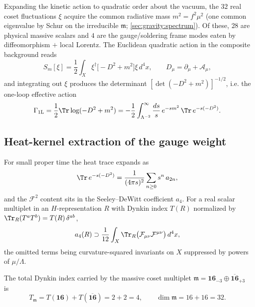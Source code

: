 Expanding the kinetic action to quadratic order about the vacuum, the
$32$ real coset fluctuations $\xi$ acquire the common radiative mass
$m^{2}=f^{2}\mu^{2}$ (one common eigenvalue by Schur on the irreducible
$\mathfrak m$; \autoref{sec:gravity:spectrum}). Of these, $28$ are
physical massive scalars and $4$ are the gauge/soldering frame modes
eaten by diffeomorphism $+$ local Lorentz. The Euclidean quadratic
action in the composite background reads
\begin{equation}\label{eq:app-ym:Squad}
  S_{m}[\xi]
  =\frac12\int_{X}\xi^{\dagger}\bigl[-D^{2}+m^{2}\bigr]\xi\,d^{4}x,
  \qquad
  D_{\mu}=\partial_{\mu}+\mathcal A_{\mu},
\end{equation}
and integrating out $\xi$ produces the determinant
$[\det(-D^{2}+m^{2})]^{-1/2}$, i.e. the one-loop effective action
\begin{equation}\label{eq:app-ym:W}
  \Gamma_{\mathrm{1L}}
  =\frac12\Tr\log(-D^{2}+m^{2})
  =-\frac12\int_{\Lambda^{-2}}^{\infty}\frac{ds}{s}\,
    e^{-sm^{2}}\,\Tr\,e^{-s(-D^{2})}.
\end{equation}

\subsection{Heat-kernel extraction of the gauge weight}
\label{sec:app-ym:heatkernel}

For small proper time the heat trace expands as
\begin{equation}\label{eq:app-ym:HK}
  \Tr\,e^{-s(-D^{2})}
  =\frac{1}{(4\pi s)^{2}}\sum_{n\ge0}s^{n}\,a_{2n},
\end{equation}
and the $\mathcal F^{2}$ content sits in the Seeley--DeWitt coefficient
$a_{4}$. For a real scalar multiplet in an $H$-representation $R$ with
Dynkin index $T(R)$ normalized by
$\Tr_{R}(T^{a}T^{b})=T(R)\,\delta^{ab}$,
\begin{equation}\label{eq:app-ym:a4}
  a_{4}(R)\supset
  \frac{1}{12}\int_{X}\Tr_{R}\bigl(\mathcal F_{\mu\nu}
  \mathcal F^{\mu\nu}\bigr)\,d^{4}x ,
\end{equation}
the omitted terms being curvature-squared invariants on $X$ suppressed
by powers of $\mu/\Lambda$.

\begin{lemma}
\label{lem:app-ym:weight}
The total Dynkin index carried by the massive coset multiplet
$\mathfrak m=\mathbf{16}_{-3}\oplus\overline{\mathbf{16}}_{+3}$ is
\begin{equation}\label{eq:app-ym:Ttot}
  T_{\mathfrak m}
  =T(\mathbf{16})+T(\overline{\mathbf{16}})
  =2+2=4 ,
  \qquad
  \dim\mathfrak m=16+16=32 .
\end{equation}
\end{lemma}

